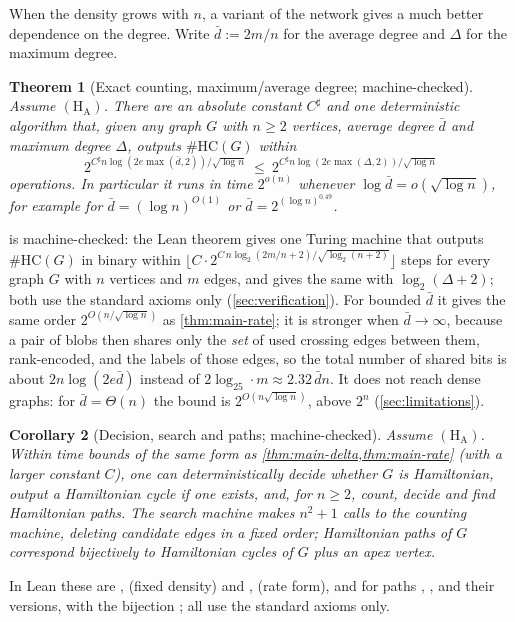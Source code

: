 \documentclass[11pt]{amsart}
\theoremstyle{plain}
\newtheorem{theorem}{Theorem}[section]
\newtheorem{corollary}[theorem]{Corollary}
\theoremstyle{definition}
\theoremstyle{remark}
\numberwithin{equation}{section}
\newcommand{\HC}{\#\mathrm{HC}}
\begin{document}
When the density grows with $n$, a variant of the network gives a much better dependence on the
degree. Write $\bar d:=2m/n$ for the average degree and $\Delta$ for the maximum degree.

\begin{theorem}[Exact counting, maximum/average degree; machine-checked]\label{thm:main-degree}
Assume $(\mathrm{H}_{\mathrm{A}})$. There are an absolute constant $C^{\sharp}$ and one
deterministic algorithm that, given any graph $G$ with $n\ge2$ vertices, average degree $\bar d$
and maximum degree $\Delta$, outputs $\HC(G)$ within
\[
  2^{C^{\sharp}n\log(2e\max(\bar d,2))/\sqrt{\log n}}\ \le\ 2^{C^{\sharp}n\log(2e\max(\Delta,2))/\sqrt{\log n}}
\]
operations. In particular it runs in time $2^{o(n)}$ whenever $\log\bar d=o(\sqrt{\log n})$, for
example for $\bar d=(\log n)^{O(1)}$ or $\bar d=2^{(\log n)^{0.49}}$.
\end{theorem}

 is machine-checked: the Lean theorem  gives one Turing
machine that outputs $\HC(G)$ in binary within
$\lfloor C\cdot2^{C\,n\log_2(2m/n+2)/\sqrt{\log_2(n+2)}}\rfloor$ steps for every graph $G$ with $n$
vertices and $m$ edges, and  gives the same with $\log_2(\Delta+2)$; both
use the standard axioms only (\cref{sec:verification}). For bounded $\bar d$ it gives the same order
$2^{O(n/\sqrt{\log n})}$ as \cref{thm:main-rate}; it is stronger when $\bar d\to\infty$, because a
pair of blobs then shares only the \emph{set} of used crossing edges between them,
rank-encoded, and the labels of those edges, so the total number of shared bits is about
$2n\log(2e\bar d)$ instead of $2\log_25\cdot m\approx2.32\,\bar dn$. It does not reach dense
graphs: for $\bar d=\Theta(n)$ the bound is $2^{O(n\sqrt{\log n})}$, above $2^n$
(\cref{sec:limitations}).

\begin{corollary}[Decision, search and paths; machine-checked]\label{cor:decision-search}
Assume $(\mathrm{H}_{\mathrm{A}})$. Within time bounds of the same form as
\cref{thm:main-delta,thm:main-rate} (with a larger constant $C$), one can deterministically decide
whether $G$ is Hamiltonian, output a Hamiltonian cycle if one exists, and, for $n\ge2$, count,
decide and find Hamiltonian paths. The search machine makes $n^2+1$ calls to the counting
machine, deleting candidate edges in a fixed order; Hamiltonian paths of $G$ correspond
bijectively to Hamiltonian cycles of $G$ plus an apex vertex.
\end{corollary}
In Lean these are ,  (fixed density) and
,  (rate form), and for paths
, ,  and their
 versions, with the bijection ; all use the standard axioms
only.
\end{document}
